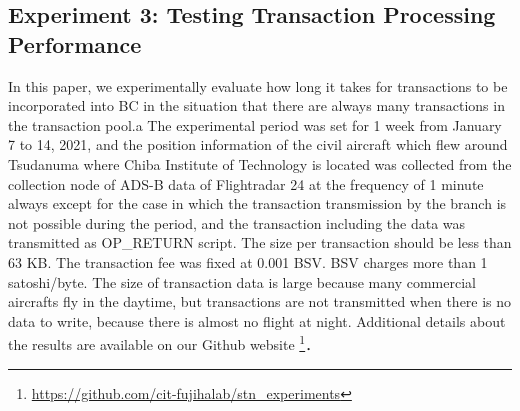 \documentclass[graybox]{svmult}
\begin{document}
\subsection{Experiment 3: Testing Transaction Processing Performance}
\label{sec:method}

In this paper, we experimentally evaluate how long it takes for transactions to be incorporated into BC in the situation that there are always many transactions in the transaction pool.a
The experimental period was set for 1 week from January 7 to 14, 2021, and the position information of the civil aircraft which flew around Tsudanuma where Chiba Institute of Technology is located was collected from the collection node of ADS-B data of Flightradar 24 \cite{flightradar24} at the frequency of 1 minute always except for the case in which the transaction transmission by the branch is not possible during the period, and the transaction including the data was transmitted as OP\_RETURN script.
The size per transaction should be less than 63 KB.
The transaction fee was fixed at 0.001 BSV.
BSV charges more than 1 satoshi/byte.
The size of transaction data is large because many commercial aircrafts fly in the daytime, but transactions are not transmitted when there is no data to write, because there is almost no flight at night.
Additional details about the results are available on our Github website 
\footnote{\url{https://github.com/cit-fujihalab/stn_experiments}}．
\end{document}
